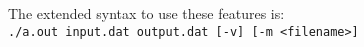 \documentclass{article}
\begin{document}
The extended syntax to use these features is:\\
\texttt{./a.out input.dat output.dat [-v] [-m <filename>]}


\end{document}
